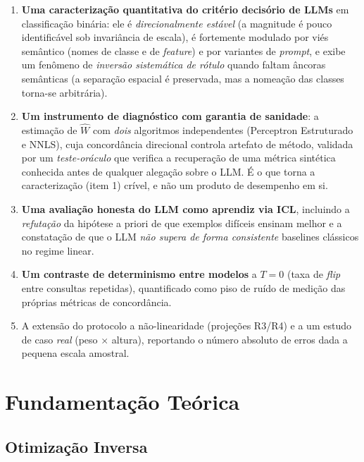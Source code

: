 \documentclass[12pt,a4paper]{article}
\newcommand{\West}{\ensuremath{\hat{W}}}   %
\begin{document}
\begin{enumerate}
  \item \textbf{Uma caracterização quantitativa do critério decisório de LLMs} em
    classificação binária: ele é \emph{direcionalmente estável} (a magnitude é pouco
    identificável sob invariância de escala),
    é fortemente modulado por viés semântico (nomes de classe e de \emph{feature}) e por
    variantes de \emph{prompt}, e exibe um fenômeno de \emph{inversão sistemática de rótulo}
    quando faltam âncoras semânticas (a separação espacial é preservada, mas a nomeação das
    classes torna-se arbitrária).
  \item \textbf{Um instrumento de diagnóstico com garantia de sanidade}: a estimação de
    \West{} com \emph{dois} algoritmos independentes (Perceptron Estruturado e NNLS), cuja
    concordância direcional controla artefato de método, validada por um \emph{teste-oráculo}
    que verifica a recuperação de uma métrica sintética conhecida antes de qualquer alegação
    sobre o LLM. É o que torna a caracterização (item 1) crível, e não um produto de
    desempenho em si.
  \item \textbf{Uma avaliação honesta do LLM como aprendiz via ICL}, incluindo a
    \emph{refutação} da hipótese a priori de que exemplos difíceis ensinam melhor e a
    constatação de que o LLM \emph{não supera de forma consistente} baselines clássicos no
    regime linear.
  \item \textbf{Um contraste de determinismo entre modelos} a $T=0$ (taxa de \emph{flip}
    entre consultas repetidas), quantificado como piso de ruído de medição das próprias
    métricas de concordância.
  \item A extensão do protocolo a não-linearidade (projeções R3/R4) e a um estudo de
    caso \emph{real} (peso $\times$ altura), reportando o número absoluto de erros dada a
    pequena escala amostral.
\end{enumerate}

\section{Fundamentação Teórica}
\label{sec:fundamentos}

\subsection{Otimização Inversa}
\end{document}
